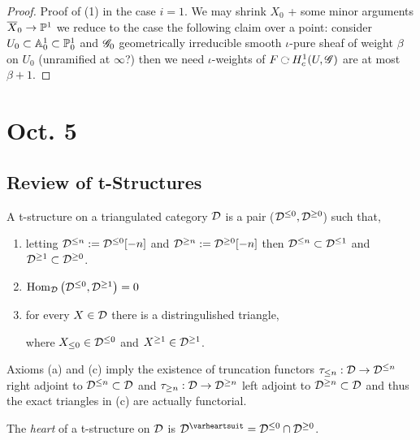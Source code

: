 \documentclass[12pt]{article}
\newcommand{\heart}{\ensuremath\varheartsuit}
\begin{document}
\begin{proof}
Proof of (1) in the case $i = 1$. We may shrink $X_0$ + some minor arguments $\overline{X}_0 \to \P^1$ we reduce to the case the following claim over a point: consider $U_0 \subset \A^1_0 \subset \P^1_0$ and $\G_0$ geometrically irreducible smooth $\iota$-pure sheaf of weight $\beta$ on $U_0$ (unramified at $\infty$?) then we need $\iota$-weights of $F \acts H^1_c(U, \G)$ are at most $\beta + 1$. 
\end{proof}

\section{Oct. 5}


\subsection{Review of t-Structures}

\begin{defn}
A t-structure on a triangulated category $\D$ is a pair ($\D^{\le 0}, \D^{\ge 0}$) such that,
\begin{enumerate}
\item letting $\D^{\le n} := \D^{\le 0}[-n]$ and $\D^{\ge n} := \D^{\ge 0}[-n]$ then $\D^{\le n} \subset \D^{\le 1}$ and $\D^{\ge 1} \subset \D^{\ge 0}$.
\item $\Hom{\D}{\D^{\le 0}}{\D^{\ge 1}} = 0$
\item for every $X \in \D$ there is a distringulished triangle,
\begin{center}
\end{center}
where $X_{\le 0} \in \D^{\le 0}$ and $X^{\ge 1} \in \D^{\ge 1}$.
\end{enumerate}
\end{defn}

\begin{prop}
Axioms (a) and (c) imply the existence of truncation functors $\tau_{\le n} : \D \to \D^{\le n}$ right adjoint to $\D^{\le n} \subset \D$ and $\tau_{\ge n} : \D \to \D^{\ge n}$ left adjoint to $\D^{\ge n} \subset \D$ and thus the exact triangles in (c) are actually functorial.
\end{prop}

\begin{defn}
The \textit{heart} of a t-structure on $\D$ is $\D^\heart = \D^{\le 0} \cap \D^{\ge 0}$.
\end{defn}
\end{document}
